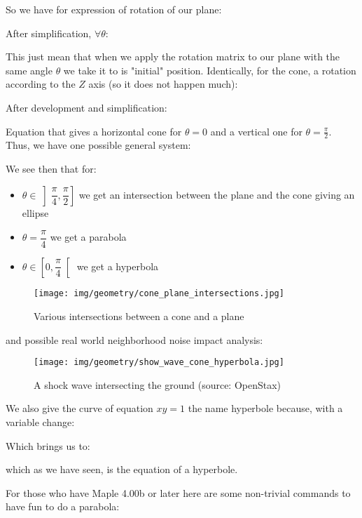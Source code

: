\begin{enumerate}
		So we have for expression of rotation of our plane:
		
		After simplification, $\forall \theta$:
		
		This just mean that when we apply the rotation matrix to our plane with the same angle $\theta$ we take it to is "initial" position.
		Identically, for the cone, a rotation according to the $Z$ axis (so it does not happen much):
		
		After development and simplification:
		
		Equation that gives a horizontal cone for $\theta=0$ and a vertical one for $\theta=\frac{\pi}{2}$.
		Thus, we have one possible general system:
		
		We see then that for:
		\begin{itemize}
			\item $\theta \in \left]\dfrac{\pi}{4},\dfrac{\pi}{2}\right]$ we get an intersection between the plane and the cone giving an ellipse
			\item $\theta=\dfrac{\pi}{4}$ we get a parabola
			\item $\theta \in \left[0,\dfrac{\pi}{4}\right[$ we get a hyperbola
		\end{itemize}
		\begin{figure}[H]
			\centering
			\texttt{[image: img/geometry/cone\_plane\_intersections.jpg]}
			\caption{Various intersections between a cone and a plane}
		\end{figure}
		and possible real world neighborhood noise impact analysis:
		\begin{figure}[H]
			\centering
			\texttt{[image: img/geometry/show\_wave\_cone\_hyperbola.jpg]}
			\caption[A shock wave intersecting the ground]{A shock wave intersecting the ground (source: OpenStax)}
		\end{figure}
		\begin{tcolorbox}[title=Remark,colframe=black,arc=10pt]
		We also give the curve of equation $xy=1$ the name hyperbole because, with a variable change:
		
		Which brings us to:
		
		which as we have seen, is the equation of a hyperbole.
		\end{tcolorbox}
		For those who have Maple 4.00b or later here are some non-trivial commands to have fun to do a parabola:
		

\end{enumerate}
